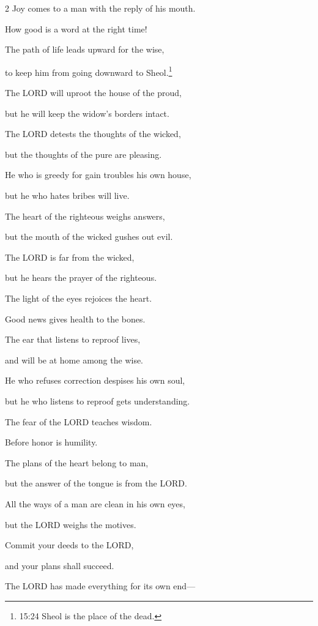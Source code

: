 \begin{multicols}{2}
\myverse{}Joy comes to a man with the reply of his mouth.

How good is a word at the right time!


\myverse{}The path of life leads upward for the wise,

to keep him from going downward to Sheol.\footnote{15:24 Sheol is the place of the dead.}


\myverse{}The LORD will uproot the house of the proud,

but he will keep the widow’s borders intact.


\myverse{}The LORD detests the thoughts of the wicked,

but the thoughts of the pure are pleasing.


\myverse{}He who is greedy for gain troubles his own house,

but he who hates bribes will live.


\myverse{}The heart of the righteous weighs answers,

but the mouth of the wicked gushes out evil.


\myverse{}The LORD is far from the wicked,

but he hears the prayer of the righteous.


\myverse{}The light of the eyes rejoices the heart.

Good news gives health to the bones.


\myverse{}The ear that listens to reproof lives,

and will be at home among the wise.


\myverse{}He who refuses correction despises his own soul,

but he who listens to reproof gets understanding.


\myverse{}The fear of the LORD teaches wisdom.

Before honor is humility.


\mychapter{} \myverse*{}The plans of the heart belong to man,

\quad\quad but the answer of the tongue is from the LORD.


\myverse{}All the ways of a man are clean in his own eyes,

but the LORD weighs the motives.


\myverse{}Commit your deeds to the LORD,

and your plans shall succeed.


\myverse{}The LORD has made everything for its own end—


\end{multicols}
